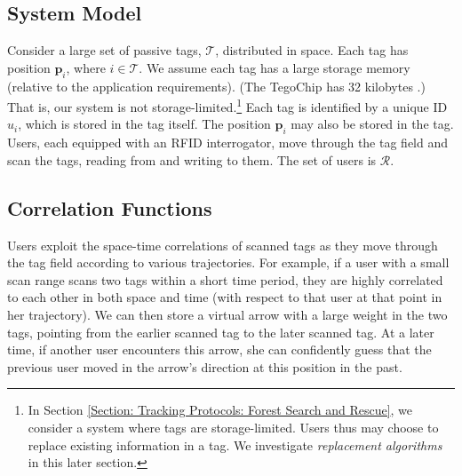 \subsection{System Model}
Consider a large set of passive tags, $\mathcal{T}$, distributed in space.  Each tag has position $\mathbf{p}_i$, where $i \in \mathcal{T}$.  We assume each tag has a large storage memory (relative to the application requirements).  (The TegoChip has 32 kilobytes \cite{Tego}.)  That is, our system is not storage-limited.\footnote{In Section \ref{Section: Tracking Protocols: Forest Search and Rescue}, we consider a system where tags are storage-limited.  Users thus may choose to replace existing information in a tag.  We investigate \emph{replacement algorithms} in this later section.}  Each tag is identified by a unique ID $u_i$, which is stored in the tag itself.  The position $\mathbf{p}_i$ may also be stored in the tag.  Users, each equipped with an RFID interrogator, move through the tag field and scan the tags, reading from and writing to them.  The set of users is $\mathcal{R}$. 

\subsection{Correlation Functions}
\label{Section: Tracking Protocols: Space-time Correlations: Correlation Functions}
Users exploit the space-time correlations of scanned tags as they move through the tag field according to various trajectories.  For example, if a user with a small scan range scans two tags within a short time period, they are highly correlated to each other in both space and time (with respect to that user at that point in her trajectory).  We can then store a virtual arrow with a large weight in the two tags, pointing from the earlier scanned tag to the later scanned tag.  At a later time, if another user encounters this arrow, she can confidently guess that the previous user moved in the arrow's direction at this position in the past.

